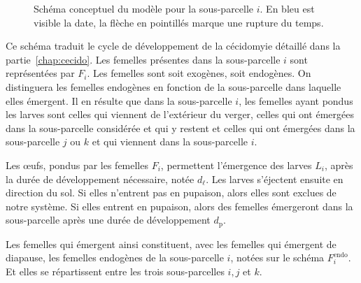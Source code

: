 \begin{figure}[ht]
 \caption{Schéma conceptuel du modèle pour la sous-parcelle $i$. En bleu est visible la date, la flèche en pointillés marque une rupture du temps.}
 \label{fig:schema}
\end{figure}

Ce schéma traduit le cycle de développement de la cécidomyie détaillé dans la partie~\ref{chap:cecido}.
Les femelles présentes dans la sous-parcelle $i$ sont représentées par $F_i$.
Les femelles sont soit exogènes, soit endogènes.
On distinguera les femelles endogènes en fonction de la sous-parcelle dans laquelle elles émergent.
Il en résulte que dans la sous-parcelle $i$, les femelles ayant pondus les larves sont celles qui viennent de l'extérieur du verger, celles qui ont émergées dans la sous-parcelle considérée et qui y restent et celles qui ont émergées dans la sous-parcelle $j$ ou $k$ et qui viennent dans la sous-parcelle $i$.

Les œufs, pondus par les femelles $F_i$, permettent l'émergence des larves $L_i$, après la durée de développement nécessaire, notée $d_{\ell}$.
Les larves s'éjectent ensuite en direction du sol.
Si elles n'entrent pas en pupaison, alors elles sont exclues de notre système.
Si elles entrent en pupaison, alors des femelles émergeront dans la sous-parcelle après une durée de développement $d_{\text{p}}$.

Les femelles qui émergent ainsi constituent, avec les femelles qui émergent de diapause, les femelles endogènes de la sous-parcelle $i$, notées sur le schéma $F_i^{\text{endo}}$.
Et elles se répartissent entre les trois sous-parcelles $i, j$ et $k$.




